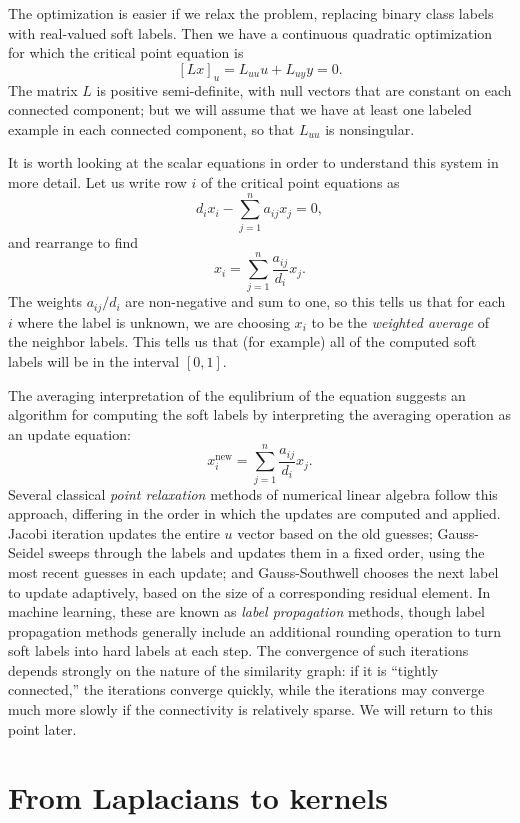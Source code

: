 \documentclass[12pt, leqno]{article} %
\begin{document}
The optimization is easier if we relax the problem, replacing binary
class labels with real-valued soft labels.  Then we have a continuous
quadratic optimization for which the critical point equation is
\[
  [Lx]_u = L_{uu} u + L_{uy} y = 0.
\]
The matrix $L$ is positive semi-definite, with null vectors that are
constant on each connected component; but we will assume that we have
at least one labeled example in each connected component, so that
$L_{uu}$ is nonsingular.

It is worth looking at the scalar equations in order to understand
this system in more detail.  Let us write row $i$ of the critical
point equations as
\[
  d_i x_i - \sum_{j=1}^n a_{ij} x_j = 0,
\]
and rearrange to find
\[
  x_i = \sum_{j=1}^n \frac{a_{ij}}{d_i} x_j.
\]
The weights $a_{ij}/d_i$ are non-negative and sum to one, so this
tells us that for each $i$ where the label is unknown, we are choosing
$x_i$ to be the {\em weighted average} of the neighbor labels.
This tells us that (for example) all of the computed soft labels will
be in the interval $[0,1]$.

The averaging interpretation of the equlibrium of the equation
suggests an algorithm for computing the soft labels by interpreting
the averaging operation as an update equation:
\[
  x_i^{\mathrm{new}} = \sum_{j=1}^n \frac{a_{ij}}{d_i} x_j.
\]
Several classical {\em point relaxation} methods of
numerical linear algebra follow this approach, differing in the
order in which the updates are computed and applied.  Jacobi iteration
updates the entire $u$ vector based on the old guesses; Gauss-Seidel
sweeps through the labels and updates them in a fixed order, using the
most recent guesses in each update; and Gauss-Southwell chooses the
next label to update adaptively, based on the size of a corresponding
residual element.  In machine learning, these are known as
{\em label propagation} methods, though label propagation methods
generally include an additional rounding operation to turn soft labels into
hard labels at each step.
The convergence of such iterations depends strongly on the
nature of the similarity graph: if it is ``tightly connected,'' the
iterations converge quickly, while the iterations may converge much
more slowly if the connectivity is relatively sparse.  We will return
to this point later.

\section{From Laplacians to kernels}
\end{document}
